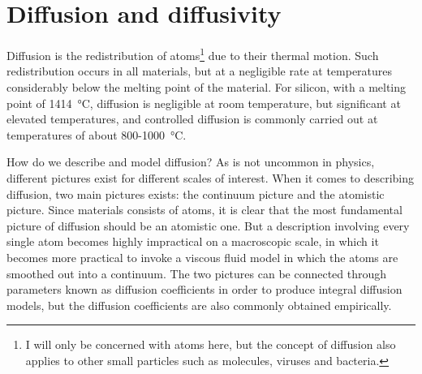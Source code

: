 \documentclass[11pt,bibliography=totoc,index=totoc]{scrbook}   %
\newcommand{\comment}[1]{\hl{#1}}
\begin{document}




%
\section{Diffusion and diffusivity}\label{sec:Diffusion}
%

Diffusion is the redistribution of atoms\footnote{I will only be concerned with atoms here, but the concept of diffusion also applies to other small particles such as molecules, viruses and bacteria.} due to their thermal motion. 
Such redistribution occurs in all materials, but at a negligible rate at temperatures considerably below the melting point of the material.
For silicon, with a melting point of \SI{1414}{\celsius}, diffusion is negligible at room temperature, 
but significant at elevated temperatures, and controlled diffusion is commonly carried out at temperatures 
of about 800-\SI{1000}{\celsius}. 

How do we describe and model diffusion?
As is not uncommon in physics, different pictures exist for different scales of interest. 
When it comes to describing diffusion, two main pictures exists: the continuum picture and the atomistic picture. 
Since materials consists of atoms, it is clear that the most fundamental picture of diffusion should be an atomistic one.
But a description involving every single atom becomes highly impractical on a macroscopic scale,
in which it becomes more practical to invoke a viscous fluid model in which the atoms are smoothed out into a continuum.
The two pictures can be connected through parameters known as diffusion coefficients in order to produce integral diffusion models,
but the diffusion coefficients are also commonly obtained empirically.
\end{document}
